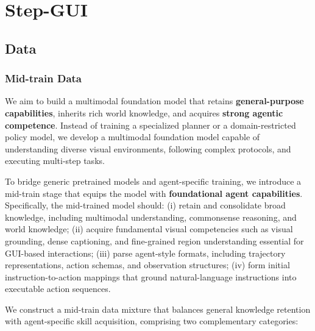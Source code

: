 
\section{Step-GUI}

\subsection{Data}
\subsubsection{Mid-train Data}

We aim to build a multimodal foundation model that retains \textbf{general-purpose capabilities}, inherits rich world knowledge, and acquires \textbf{strong agentic competence}. Instead of training a specialized planner or a domain-restricted policy model, we develop a multimodal foundation model capable of understanding diverse visual environments, following complex protocols, and executing multi-step tasks.

To bridge generic pretrained models and agent-specific training, we introduce a mid-train stage that equips the model with \textbf{foundational agent capabilities}. Specifically, the mid-trained model should: (i) retain and consolidate broad knowledge, including multimodal understanding, commonsense reasoning, and world knowledge; (ii) acquire fundamental visual competencies such as visual grounding, dense captioning, and fine-grained region understanding essential for GUI-based interactions; (iii) parse agent-style formats, including trajectory representations, action schemas, and observation structures; (iv) form initial instruction-to-action mappings that ground natural-language instructions into executable action sequences.

We construct a mid-train data mixture that balances general knowledge retention with agent-specific skill acquisition, comprising two complementary categories:

